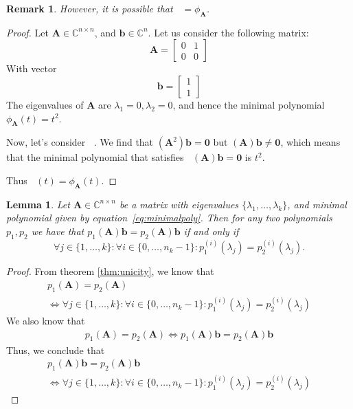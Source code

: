 \documentclass[11pt]{article}
\DeclareMathOperator{\phiAb}{\phi_{\mathbf{A},\mathbf{b}}}
\newtheorem{lemma}{Lemma}[section]
\newtheorem{remark}{Remark}[section]
\numberwithin{equation}{section}
\begin{document}
\begin{remark}
    However, it is possible that $\phiAb = \phi_{\mathbf{A}}$.
\end{remark}
\begin{proof}
    Let $\mathbf{A}\in\mathbb{C}^{n\times n}$, and $\mathbf{b}\in\mathbb{C}^n$. Let us consider the following matrix:
    \begin{equation*}
        \mathbf{A} = \begin{bmatrix}
            0 & 1 \\
            0 & 0
        \end{bmatrix}
    \end{equation*}
    With vector
    \begin{equation*}
        \mathbf{b} = \begin{bmatrix}
            1 \\
            1
        \end{bmatrix}
    \end{equation*}
    The eigenvalues of $\mathbf{A}$ are $\lambda_1 = 0, \lambda_2 = 0$, and hence the minimal polynomial $\phi_{\mathbf{A}}(t) = t^2$.

    Now, let's consider $\phiAb$. We find that $(\mathbf{A}^2)\mathbf{b} = \mathbf{0}$ but $(\mathbf{A})\mathbf{b} \neq \mathbf{0}$, which means that the minimal polynomial that satisfies $\phiAb(\mathbf{A})\mathbf{b} = \mathbf{0}$ is $t^2$.

    Thus $\phiAb(t) = \phi_{\mathbf{A}}(t)$.
\end{proof}

\begin{lemma}\label{lem:phiAb}
    Let $\mathbf{A}\in \mathbb{C}^{n\times n}$ be a matrix with eigenvalues $\{\lambda_1,\ldots,\lambda_k\}$, and minimal polynomial given by equation~\ref{eq:minimalpoly}. Then for any two polynomials $p_1,p_2$ we have that $p_1(\mathbf{A})\mathbf{b}=p_2(\mathbf{A})\mathbf{b}$ if and only if 
$$\forall j\in\{1,\ldots,k\}:\forall i\in\{0,\ldots,n_k-1\}: p_1^{(i)}(\lambda_j)=p_2^{(i)}(\lambda_j).$$
\end{lemma}

\begin{proof}
    From theorem \ref{thm:unicity}, we know that
    \begin{align*}
        p_1(\mathbf{A}) = p_2(\mathbf{A}) \\ \Leftrightarrow \forall j\in\{1,\ldots,k\}:\forall i\in\{0,\ldots,n_k-1\}: p_1^{(i)}(\lambda_j)=p_2^{(i)}(\lambda_j)
    \end{align*}
    We also know that 
    \begin{align*}
        p_1(\mathbf{A}) = p_2(\mathbf{A}) \Leftrightarrow p_1(\mathbf{A})\mathbf{b} = p_2(\mathbf{A})\mathbf{b}
    \end{align*}
    Thus, we conclude that
    \begin{align*}
        p_1(\mathbf{A})\mathbf{b} = p_2(\mathbf{A})\mathbf{b} \\ \Leftrightarrow \forall j\in\{1,\ldots,k\}:\forall i\in\{0,\ldots,n_k-1\}: p_1^{(i)}(\lambda_j)=p_2^{(i)}(\lambda_j)
    \end{align*}
\end{proof}
\end{document}
